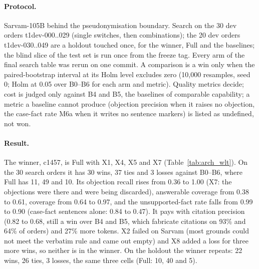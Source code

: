 \paragraph{Protocol.} Sarvam-105B behind the pseudonymisation boundary. Search on the 30 dev orders t1dev-000..029 (single switches, then combinations); the 20 dev orders t1dev-030..049 are a holdout touched once, for the winner, Full and the baselines; the blind slice of the test set is run once from the freeze tag. Every arm of the final search table was rerun on one commit. A comparison is a win only when the paired-bootstrap interval at its Holm level excludes zero (10{,}000 resamples, seed 0; Holm at 0.05 over B0--B6 for each arm and metric). Quality metrics decide; cost is judged only against B4 and B5, the baselines of comparable capability; a metric a baseline cannot produce (objection precision when it raises no objection, the case-fact rate M6a when it writes no sentence markers) is listed as undefined, not won.


\paragraph{Result.} The winner, c1457, is Full with X1, X4, X5 and X7 (Table~\ref{tab:arch_wlt}). On the 30 search orders it has 30 wins, 37 ties and 3 losses against B0--B6, where Full has 11, 49 and 10. Its objection recall rises from 0.36 to 1.00 (X7: the objections were there and were being discarded), answerable coverage from 0.38 to 0.61, coverage from 0.64 to 0.97, and the unsupported-fact rate falls from 0.99 to 0.90 (case-fact sentences alone: 0.84 to 0.47). It pays with citation precision (0.82 to 0.68, still a win over B4 and B5, which fabricate citations on 93\% and 64\% of orders) and 27\% more tokens. X2 failed on Sarvam (most grounds could not meet the verbatim rule and came out empty) and X8 added a loss for three more wins, so neither is in the winner. On the holdout the winner repeats: 22 wins, 26 ties, 3 losses, the same three cells (Full: 10, 40 and 5).

